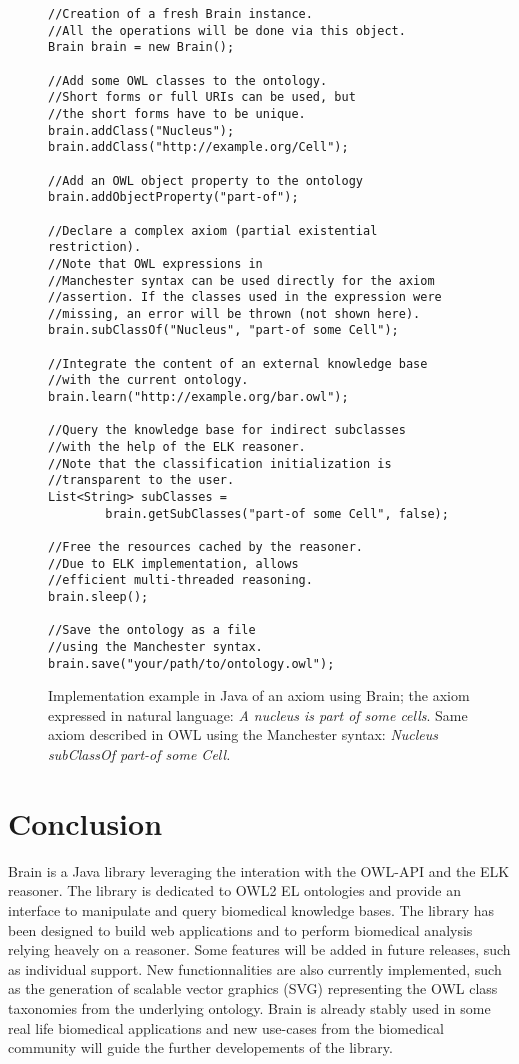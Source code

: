 \documentclass{llncs}
\begin{document}
\begin{figure}[h]
\begingroup
\fontsize{10pt}{9pt}\selectfont
\begin{Verbatim}[frame=single]
//Creation of a fresh Brain instance.
//All the operations will be done via this object.
Brain brain = new Brain();

//Add some OWL classes to the ontology.
//Short forms or full URIs can be used, but 
//the short forms have to be unique.
brain.addClass("Nucleus");
brain.addClass("http://example.org/Cell");

//Add an OWL object property to the ontology
brain.addObjectProperty("part-of");

//Declare a complex axiom (partial existential restriction).
//Note that OWL expressions in 
//Manchester syntax can be used directly for the axiom
//assertion. If the classes used in the expression were
//missing, an error will be thrown (not shown here).
brain.subClassOf("Nucleus", "part-of some Cell");

//Integrate the content of an external knowledge base
//with the current ontology.
brain.learn("http://example.org/bar.owl");

//Query the knowledge base for indirect subclasses
//with the help of the ELK reasoner.
//Note that the classification initialization is
//transparent to the user.
List<String> subClasses = 
		brain.getSubClasses("part-of some Cell", false);

//Free the resources cached by the reasoner.
//Due to ELK implementation, allows 
//efficient multi-threaded reasoning.
brain.sleep();

//Save the ontology as a file
//using the Manchester syntax.
brain.save("your/path/to/ontology.owl");
\end{Verbatim}
\endgroup
\caption{Implementation example in Java of an axiom using Brain; the axiom expressed in natural language:
 \textit{A nucleus is part of some cells}. Same axiom described in OWL using the Manchester syntax: 
 \textit{Nucleus subClassOf part-of some Cell.}}
\end{figure}

\section{Conclusion}
Brain is a Java library leveraging the interation with the OWL-API and the ELK reasoner. The library is dedicated to OWL2 EL ontologies
and provide an interface to manipulate and query biomedical knowledge bases. The library has been designed to build web applications
and to perform biomedical analysis relying heavely on a reasoner.
Some features will be added in future releases, such as
individual support. New functionnalities are also currently implemented, such as the generation of scalable vector graphics (SVG) representing
the OWL class taxonomies from the underlying ontology. Brain is already stably used in some real life biomedical applications and new
use-cases from the biomedical community will guide the further developements of the library.
\end{document}
